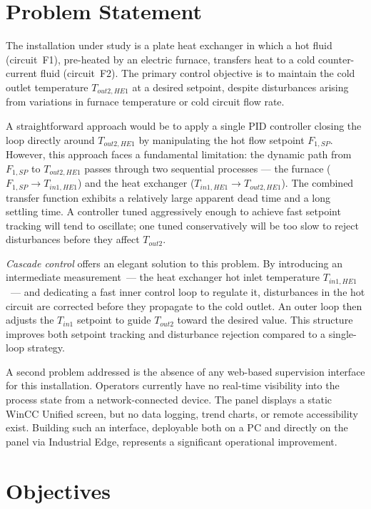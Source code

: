 \section{Problem Statement}

The installation under study is a plate heat exchanger in which a hot fluid (circuit~F1),
pre-heated by an electric furnace, transfers heat to a cold counter-current fluid
(circuit~F2). The primary control objective is to maintain the cold outlet temperature
$T_{out2,HE1}$ at a desired setpoint, despite disturbances arising from variations in
furnace temperature or cold circuit flow rate.

A straightforward approach would be to apply a single PID controller closing the loop
directly around $T_{out2,HE1}$ by manipulating the hot flow setpoint $F_{1,SP}$.
However, this approach faces a fundamental limitation: the dynamic path from $F_{1,SP}$
to $T_{out2,HE1}$ passes through two sequential processes --- the furnace
($F_{1,SP} \rightarrow T_{in1,HE1}$) and the heat exchanger
($T_{in1,HE1} \rightarrow T_{out2,HE1}$). The combined transfer function exhibits a
relatively large apparent dead time and a long settling time. A controller tuned
aggressively enough to achieve fast setpoint tracking will tend to oscillate; one tuned
conservatively will be too slow to reject disturbances before they affect $T_{out2}$.

\textit{Cascade control} offers an elegant solution to this problem. By introducing an
intermediate measurement~--- the heat exchanger hot inlet temperature $T_{in1,HE1}$~---
and dedicating a fast inner control loop to regulate it, disturbances in the hot circuit
are corrected before they propagate to the cold outlet. An outer loop then adjusts the
$T_{in1}$ setpoint to guide $T_{out2}$ toward the desired value. This structure improves
both setpoint tracking and disturbance rejection compared to a single-loop strategy.

A second problem addressed is the absence of any web-based supervision interface for this
installation. Operators currently have no real-time visibility into the process state from
a network-connected device. The panel displays a static WinCC Unified screen, but no data
logging, trend charts, or remote accessibility exist. Building such an interface, deployable
both on a PC and directly on the panel via Industrial Edge, represents a significant
operational improvement.

\section{Objectives}

